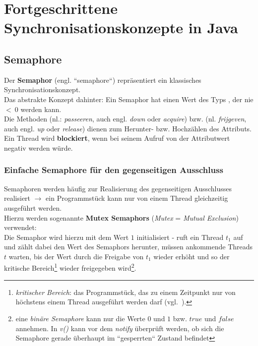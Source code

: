 \chapter{Fortgeschrittene Synchronisationskonzepte in Java}


\section{Semaphore}

Der \textbf{Semaphor} (engl. ``semaphore``) repräsentiert ein klassisches Synchronisationskonzept.\\

\noindent
Das abstrakte Konzept dahinter: Ein Semaphor hat einen Wert des Typs , der nie $<\ 0$ werden kann.\\
Die Methoden  (nl.: \textit{passeeren}, auch engl. \textit{down} oder \textit{acquire}) bzw.  (nl. \textit{frijgeven}, auch engl. \textit{up} oder \textit{release}) dienen zum Herunter- bzw. Hochzählen des Attributs.\\

\noindent
Ein Thread wird \textbf{blockiert}, wenn bei seinem Aufruf von  der Attributwert negativ werden würde.

\subsection{Einfache Semaphore für den gegenseitigen Ausschluss}

Semaphoren werden häufig zur Realisierung des gegenseitigen Ausschlusses realisiert $\rightarrow$ ein Programmstück kann nur von einem Thread gleichzeitig ausgeführt werden.\\

\noindent
Hierzu werden sogenannte \textbf{Mutex Semaphors} (\textit{Mutex} = \textit{Mutual Exclusion}) verwendet:\\
Die Semaphor wird hierzu mit dem Wert $1$ initialisiert - ruft ein Thread $t_1$  auf und zählt dabei den Wert des Semaphors herunter, müssen ankommende Threads $t$ warten, bis der Wert durch die Freigabe von $t_1$ wieder erhöht und so der kritische Bereich\footnote{
    \textit{kritischer Bereich}: das Programmstück, das zu einem Zeitpunkt nur von höchstens einem Thread ausgeführt werden darf (vgl.~\cite[102]{Oec22}).
} wieder freigegeben wird\footnote{eine \textit{binäre Semaphore} kann nur die Werte $0$ und $1$ bzw. $true$ und $false$ annehmen. In \textit{v()} kann vor dem \textit{notify} überprüft werden, ob sich die Semaphore gerade überhaupt im ``gesperrten`` Zustand befindet}.\\

